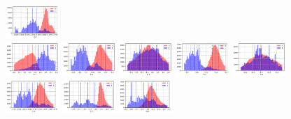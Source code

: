 \documentclass[11pt]{article}
\begin{document}
\begin{figure}[H]
  \includegraphics[width=0.18\textwidth]{../code/Task3/Analysis/Hist-V10.jpg} \\
  \includegraphics[width=0.18\textwidth]{../code/Task3/Analysis/Hist-V11.jpg}
  \includegraphics[width=0.18\textwidth]{../code/Task3/Analysis/Hist-V12.jpg}
  \includegraphics[width=0.18\textwidth]{../code/Task3/Analysis/Hist-V13.jpg}
  \includegraphics[width=0.18\textwidth]{../code/Task3/Analysis/Hist-V14.jpg}
  \includegraphics[width=0.18\textwidth]{../code/Task3/Analysis/Hist-V15.jpg} \\
  \includegraphics[width=0.18\textwidth]{../code/Task3/Analysis/Hist-V16.jpg}
  \includegraphics[width=0.18\textwidth]{../code/Task3/Analysis/Hist-V17.jpg}
  \includegraphics[width=0.18\textwidth]{../code/Task3/Analysis/Hist-V18.jpg}

\end{figure}
\end{document}
